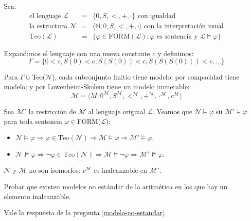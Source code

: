 \begin{questions}
\begin{solution}

 Sea:
 \begin{eqnarray*}
 \text{el lenguaje }\mathcal{L}&=&\{0,S,<,+,\cdotp\} \text{ con igualdad}\\
 \text{la estructura }\mathcal{N}&=&\langle\mathbb{N};0,S,<,+,\cdotp\rangle \text{ con la interpretaci\'on usual}\\
 \text{Teo}(\mathcal{L})&=&\{\varphi\in\text{FORM}(\mathcal{L}) : \varphi\text{ es sentencia y }\mathcal{L}\vDash\varphi\}
 \end{eqnarray*}

 Expandimos el lenguaje con una nueva constante $c$ y definimos: 
 \begin{equation*}
  \Gamma = \{0 < c, S(0)<c, S(S(0))<c, S(S(S(0)))<c, \dots\}
 \end{equation*}

  Para $\Gamma\cup$Teo($\mathcal{N}$), cada subconjunto finitio tiene modelo; por compacidad tiene modelo; y por Lowenheim-Skolem tiene un modelo numerable: 
  \begin{equation*}
   \mathcal{M} = \langle M;0^\mathcal{M}, S^\mathcal{M},<^\mathcal{M},+^\mathcal{M},\cdotp^\mathcal{M},c^\mathcal{M}\rangle
  \end{equation*}
  
  Sea $\mathcal{M}'$ la restricci\'on de $\mathcal{M}$ al lenguaje original $\mathcal{L}$. Veamos que $\mathcal{N}\vDash\varphi$ sii $\mathcal{M}'\vDash\varphi$ para toda sentencia $\varphi\in$FORM($\mathcal{L}$): 
  
  \begin{itemize}
   \item $\mathcal{N}\vDash\varphi \Rightarrow \varphi\in\text{Teo}(\mathcal{N}) \Rightarrow \mathcal{M}\vDash\varphi \Rightarrow \mathcal{M}'\vDash\varphi$.
   \item $\mathcal{N}\nvDash\varphi \Rightarrow \neg\varphi\in\text{Teo}(\mathcal{N}) \Rightarrow \mathcal{M}\vDash\neg\varphi \Rightarrow \mathcal{M}'\nvDash\varphi$.
  \end{itemize}
  
  $\mathcal{N}$ y $\mathcal{M}$ no son isomorfos: $c^\mathcal{M}$ es inalcanzable en $\mathcal{M}'$.

\end{solution}

\question Probar que existen modelos no est\'andar de la aritm\'etica en los que hay un elemento inalcanzable. 

\begin{solution} 
Vale la respuesta de la pregunta \ref{modelo-no-estandar}.
\end{solution}


\end{questions}
